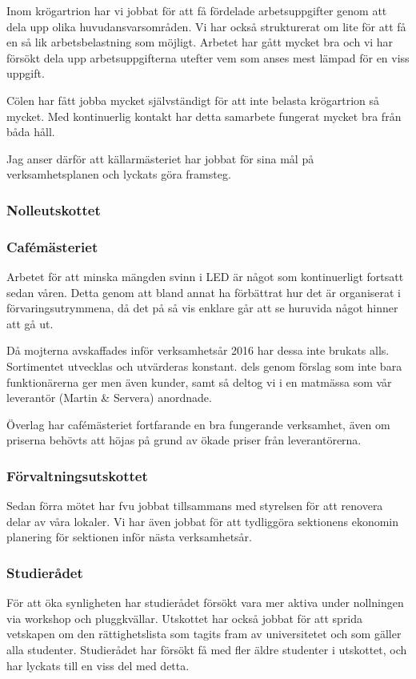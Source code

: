 \documentclass[../_main/handlingar.tex]{subfiles}
\begin{document}
Inom krögartrion har vi jobbat för att få fördelade arbetsuppgifter genom att dela upp olika huvudansvarsområden. Vi har också strukturerat om lite för att få en så lik arbetsbelastning som möjligt. Arbetet har gått mycket bra och vi har försökt dela upp arbetsuppgifterna utefter vem som anses mest lämpad för en viss uppgift.

Cölen har fått jobba mycket självständigt för att inte belasta krögartrion så mycket. Med kontinuerlig kontakt har detta samarbete fungerat mycket bra från båda håll.

Jag anser därför att källarmästeriet har jobbat för sina mål på verksamhetsplanen och lyckats göra framsteg.

\subsubsection*{Nolleutskottet}

\subsubsection*{Cafémästeriet}
Arbetet för att minska mängden svinn i LED är något som kontinuerligt fortsatt sedan våren. Detta genom att bland annat ha förbättrat hur det är organiserat i förvaringsutrymmena, då det på så vis enklare går att se huruvida något hinner att gå ut.

Då mojterna avskaffades inför verksamhetsår 2016 har dessa inte brukats alls.
Sortimentet utvecklas och utvärderas konstant. dels genom förslag som inte bara funktionärerna ger men även kunder, samt så deltog vi i en matmässa som vår leverantör (Martin \& Servera) anordnade.

Överlag har cafémästeriet fortfarande en bra fungerande verksamhet, även om priserna behövts att höjas på grund av ökade priser från leverantörerna.

\subsubsection*{Förvaltningsutskottet}
Sedan förra mötet har fvu jobbat tillsammans med styrelsen för att renovera delar av våra lokaler. Vi har även jobbat för att tydliggöra sektionens ekonomin planering för sektionen inför nästa verksamhetsår.

\subsubsection*{Studierådet}
För att öka synligheten har studierådet försökt vara mer aktiva under nollningen via workshop och pluggkvällar. Utskottet har också jobbat för att sprida vetskapen om den rättighetslista som tagits fram av universitetet och som gäller alla studenter. Studierådet har försökt få med fler äldre studenter i utskottet, och har lyckats till en viss del med detta.
\end{document}
